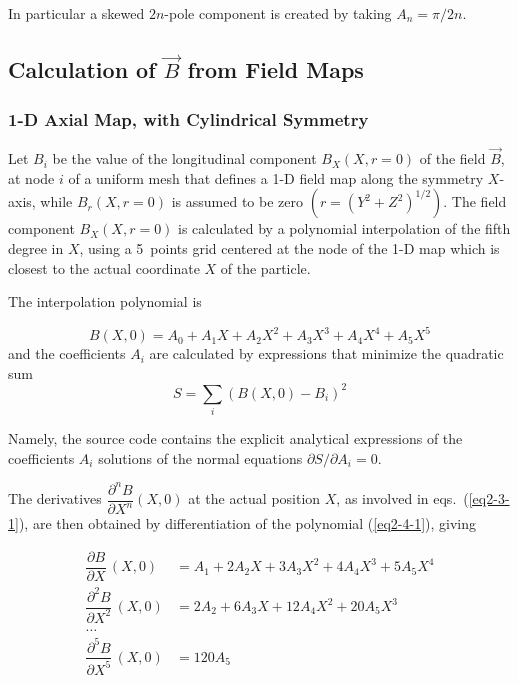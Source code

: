 In particular a skewed $2n$-pole component is created  by taking $A_n = \pi/2n$.



\subsection{Calculation of $ \vec B $ from Field Maps}  \label{seq2.4}

\subsubsection{1-D Axial Map, with Cylindrical Symmetry}  \label{sec2.4.1}

 Let $ B_i $ be the value of the longitudinal component $ B_X(X,r=0)$ of the 
field $ \vec  B$, at  node $ i $ of a uniform mesh that defines a 1-D
field map along the symmetry $ X$-axis, while $ B_r(X,r=0) $ is assumed to be zero 
$(r=(Y^2+Z^2)^{1/2})$. The field component $B_X(X,r=0) $ 
is calculated by a polynomial interpolation of the fifth degree in $ X$,  
using a 5~points grid centered at the node of the 1-D map which is closest 
to the actual coordinate $ X $ of the particle. 

\noindent The interpolation polynomial is

 \begin{equation}
	 B(X,0)=A_0 + A_1 X + A_2 X^2 + A_3 X^3 + A_4 X^4 + A_5 X^5 
 	\label{eq2-4-1}
 \end{equation}
and the coefficients $ A_i $ are calculated by expressions that
minimize the quadratic sum
\medskip
 \begin{equation}
     S = \sum_i \left(B(X,0)-B_i \right)^2  
 	\label{eq2-4-2}
 \end{equation}

\noindent Namely, the source code contains the explicit analytical 
expressions of the coefficients $A_i$ solutions of the normal 
equations $\partial S / \partial A_i = 0$.

\noindent The derivatives $  \dfrac{ \partial^n B }{ \partial X^n}
(X,0) $ at the actual position $ X$,  as involved 
in eqs.~(\ref{eq2-3-1}), are then obtained by differentiation of the polynomial 
(\ref{eq2-4-1}), giving

\begin{equation}
	\begin{aligned}
		\dfrac{ \partial B }{ \partial X}\, (X,0) 
		  &  =  A_1 + 2 A_2 X + 3 A_3 X^2 + 4 A_4 X^3 + 5 A_5 X^4 \\
		\dfrac{\partial^2 B }{ \partial X^2}\, (X,0)  
		  & = 2 A_2 + 6 A_3 X + 12 A_4 X^2 + 20 A_5 X^3 \\
		\ldots & \\
		 \dfrac{\partial^5 B }{ \partial X^5}\, (X,0) 
		  & = 120 A_5 
	\end{aligned}
	\label{eq2-4-3}
\end{equation}
  
